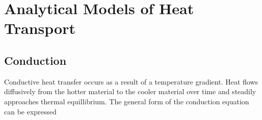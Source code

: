 










\section{Analytical Models of Heat Transport} \label{sec:analytical_heat}

\subsection{Conduction}

Conductive heat transfer occurs as a result of a temperature gradient. Heat 
flows diffusively from the hotter material to the cooler material over time and
steadily approaches thermal equillibrium. The general form of the conduction 
equation can be expressed

